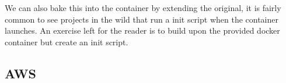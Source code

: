 \documentclass{csse4400}
\begin{document}
We can also bake this into the container by extending the original, it is fairly common to see projects
in the wild that run a init script when the container launches. An exercise left for the reader is to 
build upon the provided docker container but create an init script.

\subsection{AWS}




\end{document}
